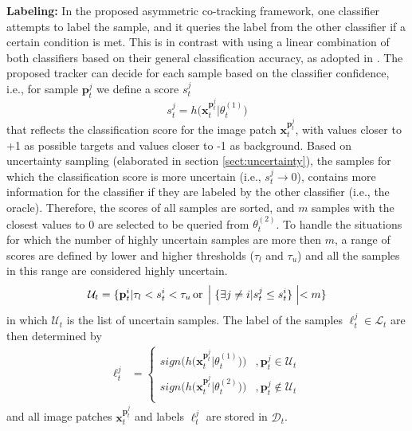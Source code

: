 \documentclass[conference,twoside]{IEEEtran}
\begin{document}
\textbf{Labeling:} In the proposed asymmetric co-tracking framework, one classifier attempts to label the sample, and it queries the label from the other classifier if a certain condition is met. This is in contrast with using a linear combination of both classifiers based on their general classification accuracy, as adopted in \cite{tang2007co}. The proposed tracker can decide for each sample based on the classifier confidence, i.e., for sample $\mathbf{p}_t^j$ we define a score $s^j_t$
\begin{equation}
s^j_t = h \big( \mathbf{x}_t^{\mathbf{p}_t^j} | \theta_t^{(1)} \big)
\label{eq:score}
\end{equation}
that reflects the classification score for the image patch $\mathbf{x}_t^{\mathbf{p}_t^j}$, with values closer to +1 as possible targets and values closer to -1 as  background. Based on uncertainty sampling (elaborated in section \ref{sect:uncertainty}), the samples for which the classification score is more uncertain (i.e., $s^j_t \rightarrow 0$), contains more information for the classifier if they are labeled by the other classifier (i.e., the oracle). Therefore, the scores of all samples are sorted, and $m$ samples with the closest values to 0 are selected to be queried from $\theta_t^{(2)}$. To handle the situations for which the number of highly uncertain samples are more then $m$, a range of scores are defined by lower and higher thresholds ($\tau_l$ and $\tau_u$) and all the samples in this range are considered highly uncertain.
\begin{equation}
\mathcal{U}_t = \{ \mathbf{p}^i_t | \tau_l < s_t^i < \tau_u \, \mathrm{or} \, \Bigm\lvert \{\exists j \neq i | s^j_t \leq s^i_t \} \Bigm\lvert <m \}
\label{eq:uncertain}
\end{equation}
in which $\mathcal{U}_t$ is the list of uncertain samples. The label of the samples $\ell^j_t \in \mathcal{L}_t$ are then determined by
\begin{align}
\ell^j_t &=
  \begin{cases}
   sign \Big( h \big( \mathbf{x}_t^{\mathbf{p}_t^j} | \theta_t^{(1)} \big) \Big)        & , \mathbf{p}_t^j \in \mathcal{U}_t\\
   sign \Big( h \big( \mathbf{x}_t^{\mathbf{p}_t^j} | \theta_t^{(2)} \big) \Big)        & , \mathbf{p}_t^j \notin \mathcal{U}_t\\
  \end{cases}
\label{eq:label}
\end{align}
and all image patches $\mathbf{x}_t^{\mathbf{p}_t^j}$ and labels $\ell^j_t$ are stored in $\mathcal{D}_t$.
\end{document}
